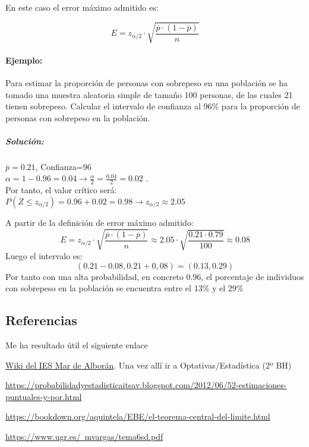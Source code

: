 En este caso el error máximo admitido es:

$$E=z_{\alpha / 2}\cdot \sqrt{\frac{\overline{p}\cdot\left(1-\overline{p} \right)}{n}}$$

\paragraph{Ejemplo:} Para estimar la proporción de personas con sobrepeso en una población se ha tomado una
muestra aleatoria simple de tamaño 100 personas, de las cuales 21 tienen sobrepeso. Calcular el intervalo
de confianza al 96\% para la proporción de personas con sobrepeso en la población.

\subparagraph{Solución:}$\overline{p}=0.21$, Confianza=$96$ \\
$\alpha=1-0.96=0.04 \to \frac{\alpha}{2}=\frac{0.04}{2}=0.02$
. \\ Por tanto, el valor crítico será: \\

$P\left(Z \leqslant z_{\alpha / 2} \right)= 0.96 + 0.02 = 0.98 \to z_{\alpha / 2} \approx 2.05$
 
A partir de la definición de error máximo admitido:
$$E=z_{\alpha / 2}\cdot \sqrt{\frac{\overline{p}\cdot\left(1-\overline{p} \right)}{n}}\approx 2.05 \cdot \sqrt{\frac{0.21\cdot 0.79}{100}}\approx 0.08$$
Luego el intervalo es: \\ 
$$\left( 0.21 - 0.08 , 0.21 + 0,08 \right) = \left(0.13, 0.29 \right)
$$
Por tanto con una alta probabilidad, en concreto 0.96, el porcentaje de individuos con sobrepeso en la población se encuentra entre el 13\% y el 29\% 

\subsection{Referencias}
Me ha resultado útil el siguiente enlace 

\href{http://maralboran.org/wikipedia/index.php/}{Wiki del IES Mar de Alborán}. Una vez allí ir a Optativas/Estadística (2º BH)

\href{https://probabilidadyestadisticaitsav.blogspot.com/2012/06/52-estimaciones-puntuales-y-por.html}{https://probabilidadyestadisticaitsav.blogspot.com/2012/06/52-estimaciones-puntuales-y-por.html}

\href{https://bookdown.org/aquintela/EBE/el-teorema-central-del-limite.html}{https://bookdown.org/aquintela/EBE/el-teorema-central-del-limite.html}

\href{https://www.ugr.es/~mvargas/tema6sd.pdf}{https://www.ugr.es/~mvargas/tema6sd.pdf}



